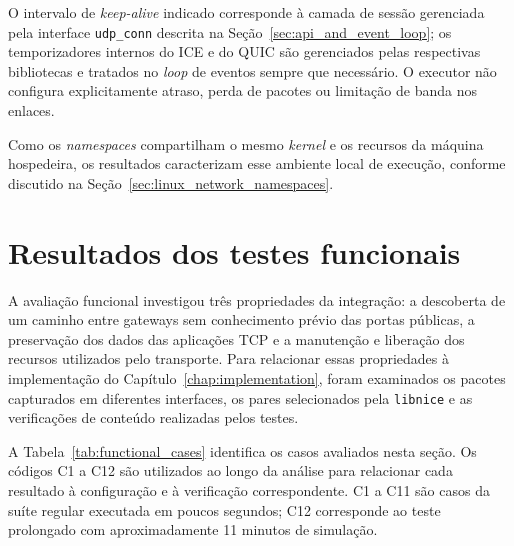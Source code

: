 O intervalo de \textit{keep-alive} indicado corresponde à camada de sessão gerenciada pela interface \texttt{udp\_conn} descrita na Seção~\ref{sec:api_and_event_loop}; os temporizadores internos do ICE e do QUIC são gerenciados pelas respectivas bibliotecas e tratados no \textit{loop} de eventos sempre que necessário. O executor não configura explicitamente atraso, perda de pacotes ou limitação de banda nos enlaces.

Como os \textit{namespaces} compartilham o mesmo \textit{kernel} e os recursos da máquina hospedeira, os resultados caracterizam esse ambiente local de execução, conforme discutido na Seção~\ref{sec:linux_network_namespaces}.

\section{Resultados dos testes funcionais}
\label{sec:functional_results}

A avaliação funcional investigou três propriedades da integração: a descoberta de um caminho entre gateways sem conhecimento prévio das portas públicas, a preservação dos dados das aplicações TCP e a manutenção e liberação dos recursos utilizados pelo transporte. Para relacionar essas propriedades à implementação do Capítulo~\ref{chap:implementation}, foram examinados os pacotes capturados em diferentes interfaces, os pares selecionados pela \texttt{libnice} e as verificações de conteúdo realizadas pelos testes.

A Tabela~\ref{tab:functional_cases} identifica os casos avaliados nesta seção. Os códigos C1 a C12 são utilizados ao longo da análise para relacionar cada resultado à configuração e à verificação correspondente. C1 a C11 são casos da suíte regular executada em poucos segundos; C12 corresponde ao teste prolongado com aproximadamente 11 minutos de simulação.

